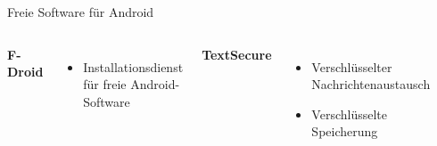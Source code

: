 \documentclass[12pt]{beamer}
\begin{document}
\begin{frame}{Freie Software für Android}
  \begin{columns}
    \column{6cm}

    \textbf{F-Droid}
    \begin{itemize}
      \item Installationsdienst für freie Android-Software
    \end{itemize}

    \vspace{0.5cm}

    \textbf{TextSecure}
    \begin{itemize}
      \item Verschlüsselter Nachrichtenaustausch
      \item Verschlüsselte Speicherung
    \end{itemize}

    \column{5cm}

    \begin{center}
      \includegraphics[width=2cm]{img/F-Droid_Logo_2}
    \par\end{center}
    \begin{center}
      \includegraphics[width=2cm]{img/TextSecure_Icon}
    \par\end{center}
  \end{columns}
\end{frame}
\end{document}
